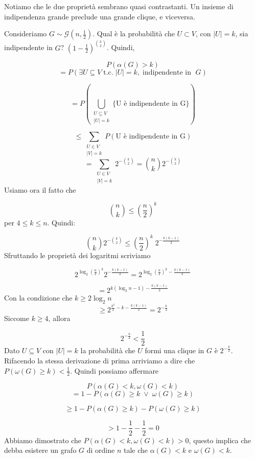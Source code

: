 \documentclass[12pt]{report}
\begin{document}
\noindent
   Notiamo che le due proprietà sembrano quasi contrastanti. Un insieme di indipendenza grande preclude una grande clique, e viceversa.

\begin{dimo}
    Consideriamo $G \sim \mathscr{G}(n,\frac{1}{2})$. Qual è la probabilità che $U \subset V$, con $|U| = k$, sia indipendente in $G$? $(1 - \frac{1}{2})^{\binom{k}{2}}$. Quindi,

        
        $$P(\alpha(G) > k )$$
        $$
            = P(\exists U \subseteq V \; \text{t.c.} \;  |U| = k,\; \text{indipendente in }\; G)$$
    

        $$= P(\bigcup_{\substack{U \subseteq V \\ |U| = k}} \{\text{U è indipendente in G}\}) $$

        $$\leq \sum_{\substack{U \in V \\ |V| = k}} P(\text{U è indipendente in G})$$
        $$= \sum_{\substack{U \in V \\ |V| = k}} 2^{-\binom{k}{2}} =  \binom{n}{k} 2^{-\binom{k}{2}}$$
        Usiamo ora il fatto che 

        $$\binom{n}{k} \leq (\frac{n}{2})^k$$
        per $4 \leq k \leq n$. Quindi:

        $$\binom{n}{k} 2^{-\binom{k}{2}} \leq (\frac{n}{2})^k \; 2^{-\frac{k(k-1)}{2}} $$
        Sfruttando le proprietà dei logaritmi scriviamo

        $$2^{\log_2{(\frac{n}{2})^k}}  2^{-\frac{k(k-1)}{2}} = 2^{\log_2{(\frac{n}{2})^k} - \frac{k(k-1)}{2} }$$

        $$= 2^{k(\log_2{n} - 1) - \frac{k(k-1)}{2}}$$
        Con la condizione che $k \geq 2\log_2{n}$
        $$\geq 2^{\frac{k^2}{2} - k - \frac{k(k-1)}{2}} = 2^{-\frac{k}{2}}$$
        Siccome $k \geq 4$, allora 

        $$2^{-\frac{k}{2}} < \frac{1}{2}$$
        Dato $U \subseteq V$ con $|U| = k$ la probabilità che $U$ formi una clique in $G$ è $2^{-\frac{k}{2}}$. Rifacendo la stessa derivazione di prima arriviamo a dire che $P(\omega(G) \geq k) < \frac{1}{2}$. Quindi possiamo affermare

        $$P(\alpha(G) < k, \omega(G) < k) $$
        $$= 1 - P(\alpha(G) \geq k \; \lor \; \omega(G) \geq k )$$

        $$\geq 1 - P(\alpha(G) \geq k) - P(\omega(G) \geq k)$$

        $$> 1 - \frac{1}{2} - \frac{1}{2} = 0$$
        Abbiamo dimostrato che  $P(\alpha(G) < k, \omega(G) < k) > 0$, questo implica che debba esistere un grafo $G$ di ordine $n$ tale che $\alpha(G) < k$ e $\omega(G) < k$.
\end{dimo}
\end{document}
